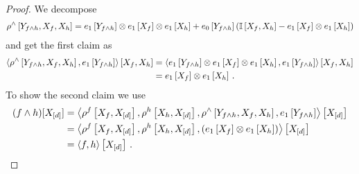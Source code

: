 \begin{proof}
	We decompose
	\begin{align*}
		\rho^{\land}\left[Y_{f\land h},X_{f},X_{h}\right]
		= e_1\left[Y_{f\land h}\right] \otimes e_1\left[X_{f}\right] \otimes e_1\left[X_{h}\right]
		+ e_0\left[Y_{f\land h}\right] \left( \mathbb{I}\left[X_{f},X_{h}\right] -  e_1\left[X_{f}\right] \otimes e_1\left[X_{h}\right] \right)
	\end{align*}
	and get the first claim as
	\begin{align*}
		\left\langle 
			\rho^{\land}\left[Y_{f\land h},X_{f},X_{h}\right],e_1\left[Y_{f\land h}\right]
		\right\rangle \left[ X_{f},X_{h} \right]
		& = \left\langle 
			e_1\left[Y_{f\land h}\right] \otimes e_1\left[X_{f}\right] \otimes e_1\left[X_{h}\right],e_1\left[Y_{f\land h}\right]
		\right\rangle \left[ X_{f},X_{h} \right] \\
		& = e_1\left[X_{f}\right] \otimes e_1\left[X_{h}\right] \, .
	\end{align*}
	To show the second claim we use
	\begin{align*}
		(f\land h)[X_{[d]}]
		&= \left\langle 
			\rho^{f}\left[X_{f},X_{[d]}\right],
			\rho^{h}\left[X_{h},X_{[d]}\right],
			\rho^{\land}\left[Y_{f\land h},X_{f},X_{h}\right],
			e_1\left[Y_{f\land h}\right]
			\right\rangle \left[ X_{[d]} \right] \\
		&  = \left\langle 
			\rho^{f}\left[X_{f},X_{[d]}\right],
			\rho^{h}\left[X_{h},X_{[d]}\right],
			(e_1\left[X_{f}\right]\otimes e_1\left[X_{h}\right])
			\right\rangle \left[ X_{[d]} \right] \\
		&= \left\langle f,h\right\rangle \left[ X_{[d]} \right] \, .
	\end{align*}
\end{proof}

